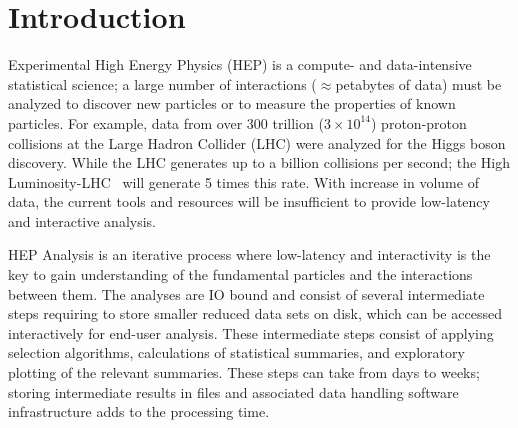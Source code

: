 \section{Introduction}
\label{sec:intro}
\squeezeup

 
Experimental High Energy Physics (HEP) is a compute- and data-intensive statistical science; 
a large number of interactions ($\approx$petabytes of data)
must be analyzed to discover new particles or to measure the properties of known particles. 
For example, data from over $300$ trillion ($3\times10^{14}$) proton-proton collisions at the 
Large Hadron Collider (LHC) were analyzed for the Higgs boson discovery. 
While the LHC generates up to a billion collisions per second; the High Luminosity-LHC~\cite{hllhc} will generate 5 times this rate.
With increase in volume of data, the current tools and resources will be insufficient to 
provide low-latency and interactive analysis. 

HEP Analysis is an iterative process where low-latency and interactivity is the key to gain 
understanding of the fundamental particles and the interactions between them. 
The analyses are IO bound and consist of several intermediate steps requiring to store 
smaller reduced data sets on disk, which can be accessed interactively for end-user analysis. 
These intermediate steps consist of applying selection algorithms, calculations of statistical summaries, 
and exploratory plotting of the relevant summaries. 
These steps can take from days to weeks; 
storing intermediate results in files and associated data handling software infrastructure 
adds to the processing time. 

